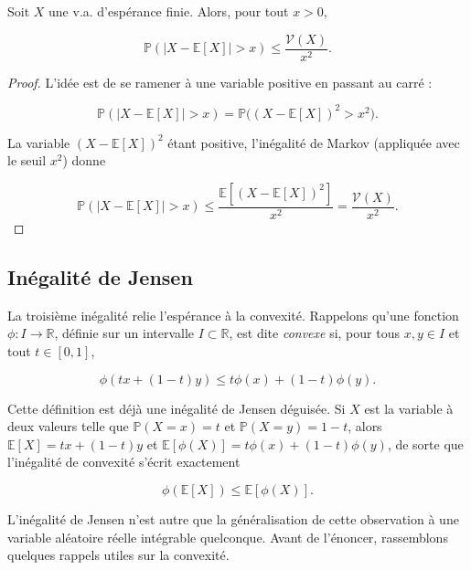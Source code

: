 \medskip

\begin{mdframed}
\begin{theoreme}
Soit $X$ une v.a. d'espérance finie. Alors, pour tout $x > 0$,

$$
\mathbb{P}(|X - \mathbb{E}[X]| > x) \leq \frac{\mathcal{V}(X)}{x^2}.
$$
\end{theoreme}
\end{mdframed}

\begin{proof}
L'idée est de se ramener à une variable positive en passant au carré :

$$
\mathbb{P}(|X - \mathbb{E}[X]| > x) = \mathbb{P}\big((X - \mathbb{E}[X])^2 > x^2\big).
$$

La variable $(X - \mathbb{E}[X])^2$ étant positive, l'inégalité de Markov (appliquée avec le seuil $x^2$) donne

$$
\mathbb{P}(|X - \mathbb{E}[X]| > x) \leq \frac{\mathbb{E}[(X - \mathbb{E}[X])^2]}{x^2} = \frac{\mathcal{V}(X)}{x^2}.
$$
\end{proof}

\subsection{Inégalité de Jensen}

La troisième inégalité relie l'espérance à la convexité. Rappelons qu'une fonction $\phi : I \to \mathbb{R}$, définie sur un intervalle $I \subset \mathbb{R}$, est dite \emph{convexe} si, pour tous $x, y \in I$ et tout $t \in [0, 1]$,

$$
\phi(tx + (1 - t)y) \leq t\phi(x) + (1 - t)\phi(y).
$$

\begin{remarque}
Cette définition est déjà une inégalité de Jensen déguisée. Si $X$ est la variable à deux valeurs telle que $\mathbb{P}(X = x) = t$ et $\mathbb{P}(X = y) = 1 - t$, alors $\mathbb{E}[X] = tx + (1 - t)y$ et $\mathbb{E}[\phi(X)] = t\phi(x) + (1 - t)\phi(y)$, de sorte que l'inégalité de convexité s'écrit exactement

$$
\phi(\mathbb{E}[X]) \leq \mathbb{E}[\phi(X)].
$$
\end{remarque}

L'inégalité de Jensen n'est autre que la généralisation de cette observation à une variable aléatoire réelle intégrable quelconque. Avant de l'énoncer, rassemblons quelques rappels utiles sur la convexité.

